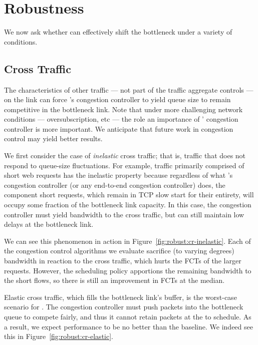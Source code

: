 \section{Robustness}\label{s:robust}

We now ask whether \name can effectively shift the bottleneck under a variety of conditions.

\subsection{Cross Traffic}\label{s:robust:cross}

The characteristics of other traffic --- not part of the traffic aggregate \name controls --- on the link can force \name's congestion controller to yield queue size to remain competitive in the bottleneck link.
Note that under more challenging network conditions --- oversubscription, etc --- the role an importance of \name' congestion controller is more important. We anticipate that future work in congestion control may yield better results.


 We first consider the case of \emph{inelastic} cross traffic; that is, traffic that does not respond to queue-size fluctuations.
For example, traffic primarily comprised of short web requests has the inelastic property because regardless of what \name's congestion controller (or any end-to-end congestion controller) does, the component short requests, which remain in TCP slow start for their entirety, will occupy some fraction of the bottleneck link capacity.
In this case, the congestion controller must yield bandwidth to the cross traffic, but can still maintain low delays at the bottleneck link.

We can see this phenomenon in action in Figure~\ref{fig:robust:cr-inelastic}. 
Each of the congestion control algorithms we evaluate sacrifice (to varying degrees) bandwidth in reaction to the cross traffic, which hurts the FCTs of the larger requests.
However, the scheduling policy apportions the remaining bandwidth to the short flows, so there is still an improvement in FCTs at the median.


 Elastic cross traffic, which fills the bottleneck link's buffer, is the worst-case scenario for \name.
The congestion controller must push packets into the bottleneck queue to compete fairly, and thus it cannot retain packets at the \inbox to schedule.
As a result, we expect performance to be no better than the baseline.
We indeed see this in Figure~\ref{fig:robust:cr-elastic}.

